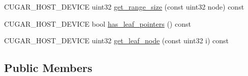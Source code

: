 \begin{DoxyCompactItemize}
C\+U\+G\+A\+R\+\_\+\+H\+O\+S\+T\+\_\+\+D\+E\+V\+I\+CE uint32 \hyperlink{structcugar_1_1_bintree__visitor_3_01_node__type_00_01leaf__index__tag_01_4_aff8180b958b78028530330ebf46956ec}{get\+\_\+range\+\_\+size} (const uint32 node) const
\item 
C\+U\+G\+A\+R\+\_\+\+H\+O\+S\+T\+\_\+\+D\+E\+V\+I\+CE bool \hyperlink{structcugar_1_1_bintree__visitor_3_01_node__type_00_01leaf__index__tag_01_4_aeb232ca294a219f6679e1d3e8ef54527}{has\+\_\+leaf\+\_\+pointers} () const
\item 
C\+U\+G\+A\+R\+\_\+\+H\+O\+S\+T\+\_\+\+D\+E\+V\+I\+CE uint32 \hyperlink{structcugar_1_1_bintree__visitor_3_01_node__type_00_01leaf__index__tag_01_4_a39a9e69c689fd192660a02d98ee7d4e0}{get\+\_\+leaf\+\_\+node} (const uint32 i) const
\end{DoxyCompactItemize}
\subsection*{Public Members}
